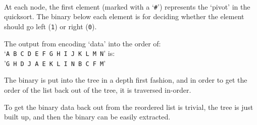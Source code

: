 \vspace{0.4cm}
\vspace{0.5cm}\\
At each node, the first element (marked with a `\texttt{\#}') represents the `pivot' in the quicksort. The binary below each element is for deciding whether the element should go left (\texttt{1}) or right (\texttt{0}).\par
The output from encoding `data' into the order of:\\
`\texttt{A B C D E F G H I J K L M N}' is:\\
'\texttt{G H D J A E K L I N B C F M}'\par
\vspace{0.3cm}
The binary is put into the tree in a depth first fashion, and in order to get the order of the list back out of the tree, it is traversed in-order.\par
To get the binary data back out from the reordered list is trivial, the tree is just built up, and then the binary can be easily extracted.\par


